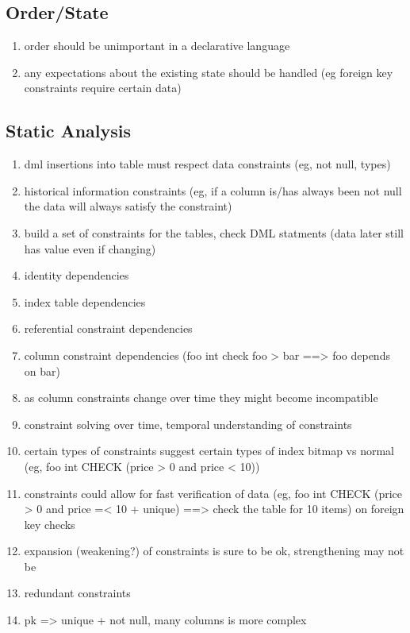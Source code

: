 \documentclass[12pt]{article}
\begin{document}
\subsection{Order/State}

\begin{enumerate}
  \item order should be unimportant in a declarative language
  \item any expectations about the existing state should be handled (eg foreign key constraints require certain data)
\end{enumerate}

\subsection{Static Analysis}
\begin{enumerate}
  \item dml insertions into table must respect data constraints (eg, not null, types)
  \item historical information constraints (eg, if a column is/has always been not null the data will always satisfy the constraint)
  \item build a set of constraints for the tables, check DML statments (data later still has value even if changing)
  \item identity dependencies
  \item index table dependencies
  \item referential constraint dependencies
  \item column constraint dependencies (foo int check foo > bar ==> foo depends on bar)
  \item as column constraints change over time they might become incompatible
  \item constraint solving over time, temporal understanding of constraints
  \item certain types of constraints suggest certain types of index bitmap vs normal (eg, foo int CHECK (price > 0 and price < 10))
  \item constraints could allow for fast verification of data (eg, foo int CHECK (price > 0 and price =< 10 + unique) ==> check the table for 10 items) on foreign key checks
  \item expansion (weakening?) of constraints is sure to be ok, strengthening may not be
  \item redundant constraints
  \item pk => unique + not null, many columns is more complex

\end{enumerate}
\end{document}
